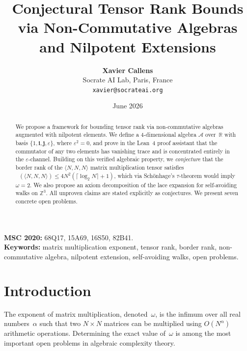 \documentclass[11pt,a4paper]{article}
\title{\textbf{Conjectural Tensor Rank Bounds via Non-Commutative Algebras\\
and Nilpotent Extensions}}
\author{
  \textbf{Xavier Callens}\\
  Socrate AI Lab, Paris, France\\
  \texttt{xavier@socrateai.org}
}
\date{June 2026}
\theoremstyle{definition}
\theoremstyle{remark}
\DeclareMathOperator{\brank}{\underline{R}}
\newcommand{\mmtensor}[3]{\langle #1, #2, #3 \rangle}
\begin{document}
\maketitle

\begin{abstract}
We propose a framework for bounding tensor rank via non-commutative
algebras augmented with nilpotent elements. We define a 4-dimensional
algebra $\mathcal{A}$ over~$\mathbb{R}$ with basis
$\{1, \mathbf{i}, \mathbf{j}, \varepsilon\}$, where
$\varepsilon^2 = 0$, and prove in the Lean~4 proof assistant that
the commutator of any two elements has vanishing trace and is
concentrated entirely in the $\varepsilon$-channel. Building on this
verified algebraic property, we \emph{conjecture} that the border rank
of the $\mmtensor{N}{N}{N}$ matrix multiplication tensor satisfies
$\brank(\mmtensor{N}{N}{N}) \le 4N^2(\lceil \log_2 N \rceil + 1)$,
which via Sch\"onhage's $\tau$-theorem would imply
$\omega = 2$. We also propose an axiom decomposition of the lace
expansion for self-avoiding walks on $\mathbb{Z}^3$.
All unproven claims are stated explicitly as conjectures.
We present seven concrete open problems.
\end{abstract}

\medskip
\noindent\textbf{MSC 2020:} 68Q17, 15A69, 16S50, 82B41.\\
\textbf{Keywords:} matrix multiplication exponent, tensor rank, border rank,
non-commutative algebra, nilpotent extension, self-avoiding walks, open problems.

\section{Introduction}\label{sec:intro}

The exponent of matrix multiplication, denoted~$\omega$, is the infimum
over all real numbers~$\alpha$ such that two $N \times N$ matrices can
be multiplied using $O(N^{\alpha})$ arithmetic operations. Determining
the exact value of~$\omega$ is among the most important open problems in
algebraic complexity theory.
\end{document}
